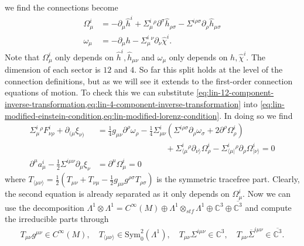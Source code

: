 \documentclass[10pt]{report}
\theoremstyle{definition}
\newcommand{\C}[0]{\mathbb{C}}
\newcommand{\E}[0]{\C^3}
\newcommand{\asd}[0]{\overline{\Sigma}}
\begin{document}
        we find the connections become
        \begin{align}
            \Omega^i_\mu &= -\partial_\mu \hat{h}^i + \Sigma^i_\mu{}^\rho \partial^\sigma \hat{h}_{\rho\sigma} - \Sigma^{i\rho\sigma} \partial_\rho \hat{h}_{\mu\sigma} \\
            \omega_\mu &= -\partial_\mu h - \Sigma^i_\mu{}^\nu \partial_\nu \hat{\chi}^i.
        \end{align}
        Note that $\Omega^i_\mu$ only depends on $\hat{h}^i, \hat{h}_{\mu\nu}$ and $\omega_\mu$ only depends on $h,\hat{\chi}^i$. The dimension of each sector is $12$ and $4$. So far this split holds at the level of the connection definitions, but as we will see it extends to the first-order connection equations of motion. To check this we can substitute \cref{eq:lin-12-component-inverse-transformation,eq:lin-4-component-inverse-transformation} into \cref{eq:lin-modified-einstein-condition,eq:lin-modified-lorenz-condition}.
        In doing so we find 
        \begin{align}
            \Sigma^i_\mu{}^\rho F^i_{\nu\rho} + \partial_{(\mu} \xi_{\nu)} &= \frac{1}{4}g_{\mu\nu} \partial^\rho \omega_\rho -\frac{1}{4} \Sigma^i_{\mu\nu} \left( \Sigma^{i\rho\sigma} \partial_\rho \omega_\sigma + 2 \partial^\rho \Omega^i_\rho \right) \nonumber \\ & \hspace{100pt} + \Sigma^i_{\langle  \mu}{}^\rho \partial_{\nu \rangle} \Omega^i_\rho - \Sigma^i_{\langle  \mu|}{}^\rho \partial_{\rho} \Omega^i_{|\nu \rangle} = 0 \label{eq:lin-modified-Ricci-in-omega-Omega} \\
            \partial^\mu a^i_\mu - \frac{1}{2}\Sigma^{i\mu\nu} \partial_\mu \xi_\nu &= \partial^\mu \Omega^i_\mu = 0
        \end{align}
        where $T_{\langle  \mu\nu \rangle} = \frac{1}{2}\left( T_{\mu\nu} + T_{\nu\mu} - \frac{1}{2} g_{\mu\nu} g^{\rho\sigma} T_{\rho\sigma} \right)$ is the symmetric tracefree part. Clearly, the second equation is already separated as it only depends on $\Omega^i_\mu$. Now we can use the decomposition $\Lambda^1 \otimes \Lambda^1 = C^\infty(M) \oplus \Lambda^1 \otimes_{stf} \Lambda^1 \oplus \E \oplus \overline{\E}$ and compute the irreducible parts through 
        \begin{align}
            T_{\mu\nu} g^{\mu\nu} \in C^\infty(M), \quad T_{\langle \mu \nu \rangle} \in \textrm{Sym}_0^2(\Lambda^1), \quad T_{\mu\nu} \Sigma^{i\mu\nu} \in \E, \quad T_{\mu\nu} \asd^{i\mu\nu} \in \overline{\E}.
        \end{align}
\end{document}
